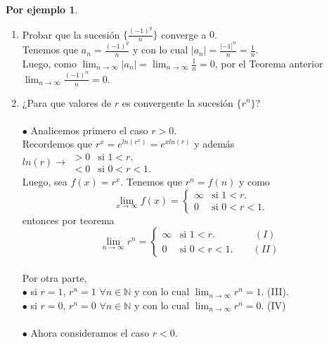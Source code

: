 \documentclass{article}
\theoremstyle{definition}
\theoremstyle{definition}
\newtheorem*{ej}{Por ejemplo}
\theoremstyle{remark}
\begin{document}
\begin{ej} \; \\
    \begin{enumerate}
      \item Probar que la sucesión $\{ \frac{(-1)^y}{n} \}$ converge a $0$. \\
        Tenemos que $a_n=\frac{(-1)^y}{n}$ y con lo cual $|a_n| = \frac{|-1|^n}{n}=\frac{1}{n}$. \\
        Luego, como $\lim_{n \to \infty }{|a_n|} = \lim_{n \to \infty }{\frac{1}{n}}=0$, por el Teorema anterior $\lim_{n \to \infty}{\frac{(-1)^n}{n}}=0$.
      \item ¿Para que valores de $r$ es convergente la sucesión $\{r^n\}$? \\\\
        \textcolor{rojop2}{$\bullet$} Analicemos primero el caso $r>0$. \\
        Recordemos que $r^x=e^{ln(r^x)}=e^{xln(r)}$ y además $ln(r) \rightarrow \begin{array}{ll}
           > 0 & \text{si } 1<r. \\
           < 0 & \text{si } 0<r<1.
        \end{array}$ \\ 
        Luego, sea $f(x)=r^x$. Tenemos que $r^n=f(n)$ y como\\ $$\lim_{x \to \infty }{f(x)} = \left\{
          \begin{array}{ll}
            \infty & \text{si } 1<r. \\
            0 & \text{si } 0<r<1.
        \end{array}\right. $$
        entonces por teorema 
        $$\lim_{n \to \infty }{r^n} = \left\{
          \begin{array}{ll}
            \infty & \text{si } 1<r. \quad \quad \quad \quad (I) \\
            0 & \text{si } 0<r<1. \quad \quad (II)
        \end{array}\right. $$ \\
        Por otra parte, \\
        $\bullet$ si $r=1$, $r^n=1$ $\forall n \in \mathbb{N}$ y con lo cual $\lim_{n \to \infty} r^n = 1.$ \quad (III). \\
        $\bullet$ si $r=0$, $r^n=0$ $\forall n \in \mathbb{N}$ y con lo cual $\lim_{n \to \infty} r^n = 0$. (IV) \\\\
        \textcolor{rojop2}{$\bullet$} Ahora consideramos el caso $r<0$. \\\\

\end{enumerate}
\end{ej}
\end{document}

